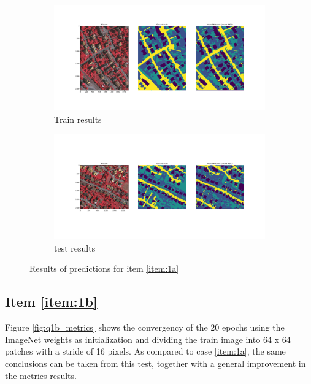 \documentclass[10pt, a4paper]{article}
\begin{document}
\begin{figure}[htpb]
  \centering
  \begin{subfigure}[b]{0.45\textwidth}
      \centering
      \includegraphics[width=\textwidth]{images/Patch32_imagenet_train.pdf}
      \caption{Train results}
      \label{fig:q1a_train}
  \end{subfigure}
  \hspace{0.05\textwidth}
  \begin{subfigure}[b]{0.45\textwidth}
    \centering
    \includegraphics[width=\textwidth]{images/Patch32_imagenet_test.pdf}
    \caption{test results}
    \label{fig:q1a_test}
  \end{subfigure}
  \caption{Results of predictions for item \ref{item:1a}}
  \label{fig:q1a_results}
\end{figure}

\subsection{Item \ref{item:1b}}

Figure \ref{fig:q1b_metrics} shows the convergency of the 20 epochs using the ImageNet weights as initialization and dividing the train image into 64 x 64 patches 
with a stride of 16 pixels. As compared to case \ref{item:1a}, the same conclusions can be taken from this test, together with a general improvement in the metrics 
results.
\end{document}
